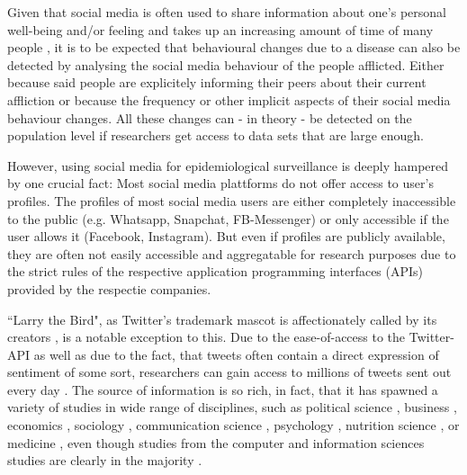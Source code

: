 \documentclass[11pt, a4paper,twoside]{report}\usepackage[]{graphicx}\usepackage[]{color}
\begin{document}
Given that social media is often used to share information about one's personal well-being and/or feeling and takes up an increasing amount of time of many people \citep{bauer_timeonline_2016,scott_time_2017,asano_socialmediatime_2017}, it is to be expected that behavioural changes due to a disease can also be detected by analysing the social media behaviour of the people afflicted. Either because said people are explicitely informing their peers about their current affliction or because the frequency or other implicit aspects of their social media behaviour changes. All these changes can - in theory - be detected on the population level if researchers get access to data sets that are large enough.

However, using social media for epidemiological surveillance is deeply hampered by one crucial fact: Most social media plattforms do not offer access to user's profiles. The profiles of most social media users are either completely inaccessible to the public (e.g. Whatsapp, Snapchat, FB-Messenger) or only accessible if the user allows it (Facebook, Instagram). But even if profiles are publicly available, they are often not easily accessible and aggregatable for research purposes due to the strict rules of the respective application programming interfaces (APIs) provided by the respectie companies.

``Larry the Bird", as Twitter's trademark mascot is affectionately called by its creators \citep{rehak_twitterbird_2014}, is a notable exception to this. Due to the ease-of-access to the Twitter-API as well as due to the fact, that tweets often contain a direct expression of sentiment of some sort, researchers can gain access to millions of tweets sent out every day \citep{twitter_annual_2017}. The source of information is so rich, in fact, that it has spawned a variety of studies in wide range of disciplines, such as political science \citep{tumasjan2010predicting,tumasjan2011election,stieglitz2012political,newman2016tracking}, business \citep{swani2014should,chae2015insights}, economics \citep{bollen2011twitter,bollen2011modeling,zhang2012predicting,sul2014trading}, sociology \citep{poblete2011all,himelboim2013birds,mccormick2015using}, communication science \citep{zhao2009and,marwick2011tweet,himelboim2013birds,hermida2013journalism}, psychology \citep{chen2011tweet,golbeck2011predicting,qiu2012you,eichstaedt2015psychological,braithwaite2016validating}, nutrition science \citep{widener2014using,vidal2015using, abbar2015you}, or medicine \citep{salathe2013dynamics,love2013twitter,nwosu2014social,adrover2015identifying,eichstaedt2015psychological,mowery2017feature}, even though studies from the computer and information sciences studies are clearly in the majority \citep{lee2013real,zimmer2014topology,steiger2015advanced}. 
\end{document}
